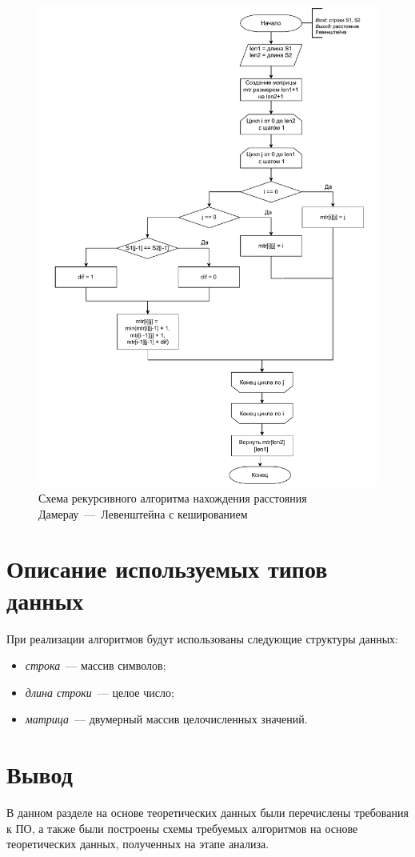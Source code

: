 \begin{figure}[h]
	\centering
	\includegraphics[height=0.9\textheight, page=5]{img/algorithms.pdf}
	\caption{Схема рекурсивного алгоритма нахождения расстояния Дамерау~---~Левенштейна с кешированием}
	\label{fig:DLrechash}
\end{figure}

\clearpage

\section{Описание используемых типов данных}

При реализации алгоритмов будут использованы следующие структуры данных:

\begin{itemize}
	\item \textit{строка}~--- массив символов;
	\item \textit{длина строки}~--- целое число;
	\item \textit{матрица}~--- двумерный массив целочисленных значений.
\end{itemize}

\section*{Вывод}

В данном разделе на основе теоретических данных были перечислены требования к ПО, а также были построены схемы требуемых алгоритмов на основе теоретических данных, полученных на этапе анализа.